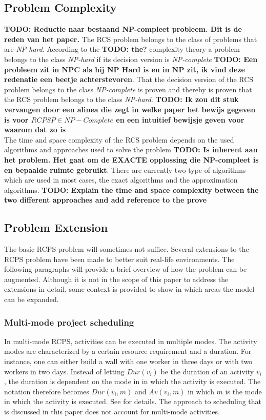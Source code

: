 \documentclass{article}
\newcommand{\TODO}[1]{{\color{red}\textbf{TODO: #1}}}
\newcommand{\dur}[1]{\textit{Dur}(#1)} %
\begin{document}
\subsection{Problem Complexity}
\TODO{Reductie naar bestaand NP-compleet probleem. Dit is de reden van het paper.}
The RCS problem belongs to the class of problems that are \emph{NP-hard}. According to the \TODO{the?} complexity theory a problem belongs to the class \emph{NP-hard} if its decision version is \emph{NP-complete} \TODO{Een probleem zit in NPC als hij NP Hard is en in NP zit, ik vind deze redenatie een beetje achterstevoren}. 
That the decision version of the RCS problem belongs to the class \emph{NP-complete} is proven and thereby is proven that the RCS problem belongs to the class \emph{NP-hard}. 
\TODO{Ik zou dit stuk vervangen door een alinea die zegt in welke paper het bewijs gegeven is voor $RCPSP \in NP-Complete$ en een intuitief bewijsje geven voor waarom dat zo is}\\
The time and space complexity of the RCS problem depends on the used algorithms and approaches used to solve the problem \TODO{Is inherent aan het problem. Het gaat om de EXACTE opplossing die NP-compleet is en bepaalde ruimte gebruikt}. 
There are currently two type of algorithms which are used in most cases, the exact algorithms and the approximation algorithms.
\TODO{Explain the time and space complexity between the two different approaches and add reference to the prove}

\subsection{Problem Extension}
The basic RCPS problem will sometimes not suffice. Several extensions to the RCPS problem have been made to better suit real-life environments. The following paragraphs will provide a brief overview of how the problem can be augmented. Although it is not in the scope of this paper to address the extensions in detail, some context is provided to show in which areas the model can be expanded.

\subsubsection{Multi-mode project scheduling}
In multi-mode RCPS, activities can be executed in multiple modes. The activity modes are characterized by a certain resource requirement and a duration. For instance, one can either build a wall with one worker in three days or with two workers in two days. Instead of letting $\dur{v_i}$ be the duration of an activity $v_i$, the duration is dependent on the mode in in which the activity is executed. The notation therefore becomes $\textit{Dur}(v_i, m)$ and $\textit{Av}(v_i, m)$ in which $m$ is the mode in which the activity is executed. See \cite{herroelen05} for details. The approach to scheduling that is discussed in this paper does not account for multi-mode activities.
\end{document}

